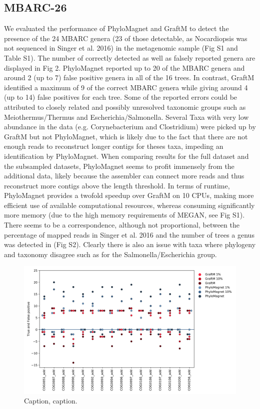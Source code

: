 \documentclass{bioinfo}
\begin{document}
\subsection{MBARC-26}
We evaluated the performance of PhyloMagnet and GraftM to detect the presence of the 24 MBARC genera (23 of those detectable, as Nocardiopsis was not sequenced in Singer et al. 2016) in the metagenomic sample (Fig S1 and Table S1). The number of correctly detected as well as falsely reported genera are displayed in Fig 2. PhyloMagnet reported up to 20 of the MBARC genera and around 2 (up to 7) false positive genera in all of the 16 trees. In contrast, GraftM identified a maximum of 9 of the correct MBARC genera while giving around 4 (up to 14) false positives for each tree. Some of the reported errors could be attributed to closely related and possibly unresolved taxonomic groups such as Meiothermus/Thermus and Escherichia/Salmonella. Several Taxa with very low abundance in the data (e.g. Corynebacterium and Clostridium) were picked up by GraftM but not PhyloMagnet, which is likely due to the fact that there are not enough reads to reconstruct longer contigs for theses taxa, impeding an identification by PhyloMagnet.
When comparing results for the full dataset and the subsampled datasets, PhyloMagnet seems to profit immensely from the additional data, likely because the assembler can connect more reads and thus reconstruct more contigs above the length threshold.
In terms of runtime, PhyloMagnet provides a twofold speedup over GraftM on 10 CPUs, making more efficient use of available computational resources, whereas consuming significantly more memory (due to the high memory requirements of MEGAN, see Fig S1).
There seems to be a correspondence, although not proportional, between the percentage of mapped reads in Singer et al. 2016 and the number of trees a genus was detected in (Fig S2). Clearly there is also an issue with taxa where phylogeny and taxonomy disagree such as for the Salmonella/Escherichia group.

\begin{figure}[!tpb]%
\centerline{\includegraphics[width=\textwidth]{figures/Fig2.png}}
\caption{Caption, caption.}\label{fig:02}
\end{figure}
\end{document}
